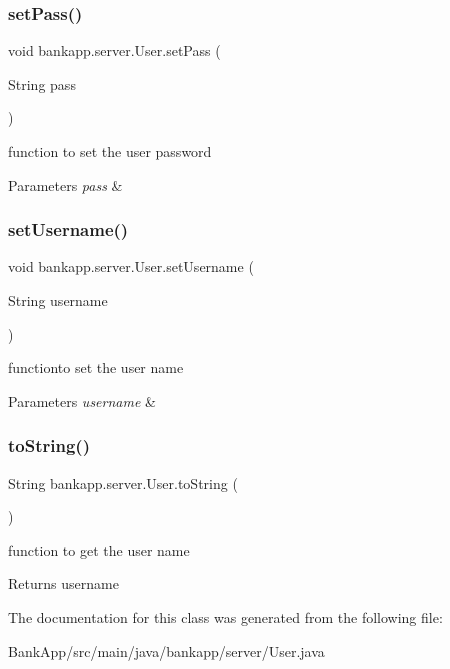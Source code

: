 \subsubsection{\texorpdfstring{set\+Pass()}{setPass()}}
{\footnotesize\ttfamily void bankapp.\+server.\+User.\+set\+Pass (\begin{DoxyParamCaption}\item[{String}]{pass }\end{DoxyParamCaption})}



function to set the user password 


\begin{DoxyParams}{Parameters}
{\em pass} & \\
\hline
\end{DoxyParams}
\mbox{\label{classbankapp_1_1server_1_1User_a928dc59410a7254dc30e433c39cf31bd}} 
\subsubsection{\texorpdfstring{set\+Username()}{setUsername()}}
{\footnotesize\ttfamily void bankapp.\+server.\+User.\+set\+Username (\begin{DoxyParamCaption}\item[{String}]{username }\end{DoxyParamCaption})}



functionto set the user name 


\begin{DoxyParams}{Parameters}
{\em username} & \\
\hline
\end{DoxyParams}
\mbox{\label{classbankapp_1_1server_1_1User_a9c6aa2df5a2c7d9cd8b4c4a228f7cbeb}} 
\subsubsection{\texorpdfstring{to\+String()}{toString()}}
{\footnotesize\ttfamily String bankapp.\+server.\+User.\+to\+String (\begin{DoxyParamCaption}{ }\end{DoxyParamCaption})}



function to get the user name 

\begin{DoxyReturn}{Returns}
username 
\end{DoxyReturn}


The documentation for this class was generated from the following file\+:\begin{DoxyCompactItemize}
\item 
Bank\+App/src/main/java/bankapp/server/User.\+java\end{DoxyCompactItemize}
